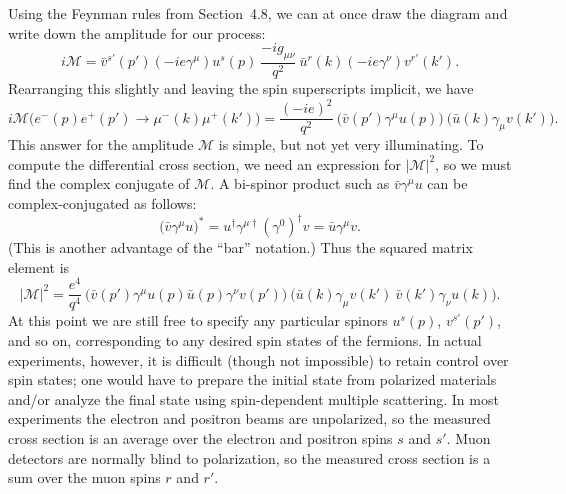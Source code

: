 Using the Feynman rules from Section~4.8, we can at once draw the diagram and
write down the amplitude for our process:
\begin{equation}
  i\mathcal{M} = \bar{v}^{s'}(p')(-ie\gamma^\mu)u^s(p)\
    \frac{-ig_{\mu\nu}}{q^2}\ \bar{u}^{r}(k)(-ie\gamma^\nu)v^{r'}(k').
\end{equation}
Rearranging this slightly and leaving the spin superscripts implicit, we have
\begin{equation}
  i\mathcal{M}\bigl( e^{-}(p)e^{+}(p') \to \mu^{-}(k)\mu^{+}(k') \bigr)
    = \frac{(-ie)^2}{q^2}\ \bigl( \bar{v}(p')\gamma^\mu u(p) \bigr)\
      \bigl( \bar{u}(k)\gamma_\mu v(k') \bigr) .
  \label{eq:5.1}
\end{equation}
This answer for the amplitude $\mathcal{M}$ is simple, but not yet very
illuminating.  To compute the differential cross section, we need an
expression for $|\mathcal{M}|^2$, so we must find the complex conjugate of
$\mathcal{M}$.  A bi-spinor product such as $\bar{v}\gamma^\mu u$ can be
complex-conjugated as follows:
\begin{equation}
  \bigl( \bar{v}\gamma^\mu u \bigr)^{*}
    = u^{\dagger}\gamma^{\mu\dagger}(\gamma^0)^{\dagger}v
    = \bar{u}\gamma^\mu v .
\end{equation}
(This is another advantage of the ``bar'' notation.)  Thus the squared matrix
element is
\begin{equation}
  |\mathcal{M}|^2 = \frac{e^4}{q^4}\ \bigl( \bar{v}(p')\gamma^\mu u(p)
    \bar{u}(p)\gamma^\nu v(p') \bigr)\
    \bigl( \bar{u}(k)\gamma_\mu v(k')\ \bar{v}(k')\gamma_\nu u(k) \bigr).
  \label{eq:5.2}
\end{equation}
At this point we are still free to specify any particular spinors $u^s(p)$,
$v^{s'}(p')$, and so on, corresponding to any desired spin states of the
fermions.  In actual experiments, however, it is difficult (though not
impossible) to retain control over spin states; one would have to prepare the
initial state from polarized materials and/or analyze the final state using
spin-dependent multiple scattering.  In most experiments the electron and
positron beams are unpolarized, so the measured cross section is an average
over the electron and positron spins $s$ and $s'$.  Muon detectors are
normally blind to polarization, so the measured cross section is a sum over
the muon spins $r$ and $r'$.


